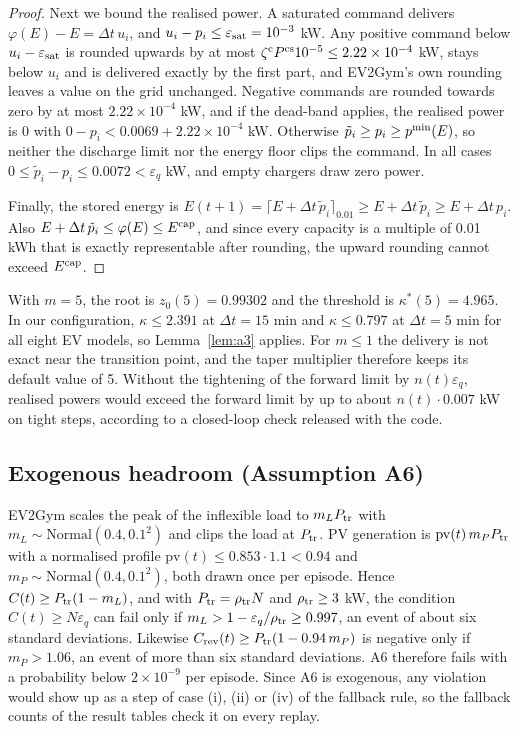 \begin{proof}
Next we bound the realised power.
A saturated command delivers $\varphi(E)-E=\Delta t\,u_i$, and $u_i-p_i\le\varepsilon_{\mathrm{sat}}=10^{-3}$ kW.
Any positive command below $u_i-\varepsilon_{\mathrm{sat}}$ is rounded upwards by at most $\zeta^{\mathrm c}P^{\mathrm{cs}}10^{-5}\le2.22\times10^{-4}$ kW, stays below $u_i$ and is delivered exactly by the first part, and EV2Gym's own rounding leaves a value on the grid unchanged.
Negative commands are rounded towards zero by at most $2.22\times10^{-4}$ kW, and if the dead-band applies, the realised power is 0 with $0-p_i<0.0069+2.22\times10^{-4}$ kW.
Otherwise $\tilde p_i\ge p_i\ge p^{\min}(E)$, so neither the discharge limit nor the energy floor clips the command.
In all cases $0\le\tilde p_i-p_i\le0.0072<\varepsilon_q$ kW, and empty chargers draw zero power.

Finally, the stored energy is $E(t+1)=\lceil E+\Delta t\,\tilde p_i\rceil_{0.01}\ge E+\Delta t\,\tilde p_i\ge E+\Delta t\,p_i$.
Also $E+\Delta t\,\tilde p_i\le\varphi(E)\le E^{\mathrm{cap}}$, and since every capacity is a multiple of 0.01 kWh that is exactly representable after rounding, the upward rounding cannot exceed $E^{\mathrm{cap}}$.
\end{proof}

With $m=5$, the root is $z_0(5)=0.99302$ and the threshold is $\kappa^{*}(5)=4.965$.
In our configuration, $\kappa\le2.391$ at $\Delta t=15$ min and $\kappa\le0.797$ at $\Delta t=5$ min for all eight EV models, so Lemma~\ref{lem:a3} applies.
For $m\le1$ the delivery is not exact near the transition point, and the taper multiplier therefore keeps its default value of 5.
Without the tightening of the forward limit by $n(t)\varepsilon_q$, realised powers would exceed the forward limit by up to about $n(t)\cdot0.007$ kW on tight steps, according to a closed-loop check released with the code.

\subsection{Exogenous headroom (Assumption A6)}\label{app:a6}

EV2Gym scales the peak of the inflexible load to $m_LP_{\mathrm{tr}}$ with $m_L\sim\mathrm{Normal}(0.4,0.1^2)$ and clips the load at $P_{\mathrm{tr}}$.
PV generation is $\mathrm{pv}(t)\,m_PP_{\mathrm{tr}}$ with a normalised profile $\mathrm{pv}(t)\le0.853\cdot1.1<0.94$ and $m_P\sim\mathrm{Normal}(0.4,0.1^2)$, both drawn once per episode.
Hence $C(t)\ge P_{\mathrm{tr}}(1-m_L)$, and with $P_{\mathrm{tr}}=\rho_{\mathrm{tr}}N$ and $\rho_{\mathrm{tr}}\ge3$ kW, the condition $C(t)\ge N\varepsilon_q$ can fail only if $m_L>1-\varepsilon_q/\rho_{\mathrm{tr}}\ge0.997$, an event of about six standard deviations.
Likewise $C_{\mathrm{rev}}(t)\ge P_{\mathrm{tr}}(1-0.94\,m_P)$ is negative only if $m_P>1.06$, an event of more than six standard deviations.
A6 therefore fails with a probability below $2\times10^{-9}$ per episode.
Since A6 is exogenous, any violation would show up as a step of case (i), (ii) or (iv) of the fallback rule, so the fallback counts of the result tables check it on every replay.


